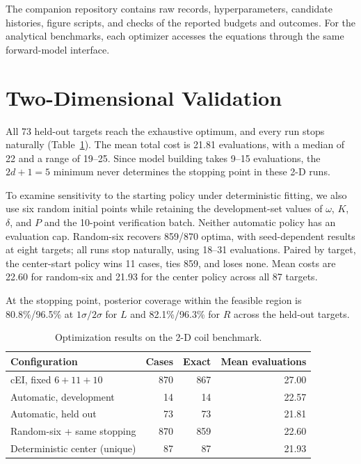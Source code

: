 \documentclass[10pt,conference,letterpaper]{IEEEtran}
\begin{document}
The companion repository contains raw records, hyperparameters, candidate histories, figure scripts, and checks of the reported budgets and outcomes. For the analytical benchmarks, each optimizer accesses the equations through the same forward-model interface.

\section{Two-Dimensional Validation}
All 73 held-out targets reach the exhaustive optimum, and every run stops naturally (Table~\ref{tab:two-d}). The mean total cost is 21.81 evaluations, with a median of 22 and a range of 19--25. Since model building takes 9--15 evaluations, the $2d+1=5$ minimum never determines the stopping point in these 2-D runs.

To examine sensitivity to the starting policy under deterministic fitting, we also use six random initial points while retaining the development-set values of $\omega$, $K$, $\delta$, and $P$ and the 10-point verification batch. Neither automatic policy has an evaluation cap. Random-six recovers 859/870 optima, with seed-dependent results at eight targets; all runs stop naturally, using 18--31 evaluations. Paired by target, the center-start policy wins 11 cases, ties 859, and loses none. Mean costs are 22.60 for random-six and 21.93 for the center policy across all 87 targets.

At the stopping point, posterior coverage within the feasible region is 80.8\%/96.5\% at $1\sigma/2\sigma$ for $L$ and 82.1\%/96.3\% for $R$ across the held-out targets.

\begin{table}[!t]
\caption{Optimization results on the 2-D coil benchmark.}
\label{tab:two-d}
\centering
\footnotesize
\begin{tabular}{@{}lrrr@{}}
\toprule
Configuration & Cases & Exact & Mean evaluations \\
\midrule
cEI, fixed $6+11+10$ & 870 & 867 & 27.00 \\
Automatic, development & 14 & 14 & 22.57 \\
Automatic, held out & 73 & 73 & 21.81 \\
Random-six + same stopping & 870 & 859 & 22.60 \\
Deterministic center (unique) & 87 & 87 & 21.93 \\
\bottomrule
\end{tabular}
\end{table}
\end{document}
